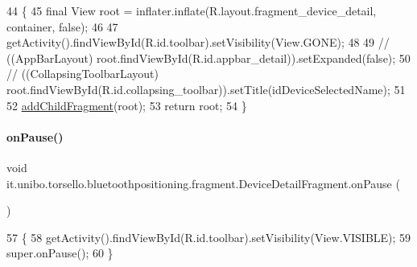 \begin{DoxyCode}
44                                                                                                       \{
45         \textcolor{keyword}{final} View root = inflater.inflate(R.layout.fragment\_device\_detail, container, \textcolor{keyword}{false});
46 
47         getActivity().findViewById(R.id.toolbar).setVisibility(View.GONE);
48 
49 \textcolor{comment}{//        ((AppBarLayout) root.findViewById(R.id.appbar\_detail)).setExpanded(false);}
50 \textcolor{comment}{//        ((CollapsingToolbarLayout)
       root.findViewById(R.id.collapsing\_toolbar)).setTitle(idDeviceSelectedName);}
51 
52         \hyperlink{classit_1_1unibo_1_1torsello_1_1bluetoothpositioning_1_1fragment_1_1DeviceDetailFragment_a62c541b8382a522f06a5d9c56cf50b26_a62c541b8382a522f06a5d9c56cf50b26}{addChildFragment}(root);
53         \textcolor{keywordflow}{return} root;
54     \}
\end{DoxyCode}
\hypertarget{classit_1_1unibo_1_1torsello_1_1bluetoothpositioning_1_1fragment_1_1DeviceDetailFragment_a1ed4762356dd3067ce48aa73da50404e_a1ed4762356dd3067ce48aa73da50404e}{}\label{classit_1_1unibo_1_1torsello_1_1bluetoothpositioning_1_1fragment_1_1DeviceDetailFragment_a1ed4762356dd3067ce48aa73da50404e_a1ed4762356dd3067ce48aa73da50404e} 
\paragraph{\texorpdfstring{on\+Pause()}{onPause()}}
{\footnotesize\ttfamily void it.\+unibo.\+torsello.\+bluetoothpositioning.\+fragment.\+Device\+Detail\+Fragment.\+on\+Pause (\begin{DoxyParamCaption}{ }\end{DoxyParamCaption})}


\begin{DoxyCode}
57                           \{
58         getActivity().findViewById(R.id.toolbar).setVisibility(View.VISIBLE);
59         super.onPause();
60     \}
\end{DoxyCode}


